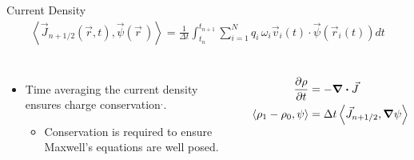 \documentclass[aspectratio=169, 16pt]{beamer}
\newcommand{\pdiff}[2]{
    \frac{\partial #1}{\partial #2}
}
\begin{document}
\begin{frame}{Current Density} 
    \vspace{1cm}
      \begin{align*}
        \left<
          \vec{J}_{n + 1/2}
          \left(\vec{r}, t\right),
          \vec{\psi}(\vec{r}\,)
          \right> =
        \frac{1}{\Delta t}
        \int_{t_n}^{t_{n+1}}
        \sum_{i=1}^N
        q_i \,\omega_i
        \vec{v}_i(t)
        \cdot
        \vec{\psi}(\vec{r}_i(t))
        dt
      \end{align*} 
      \vspace{-1cm}
  \begin{columns}
      \vspace{0.5cm}
      \begin{itemize}
        \item Time averaging the current density ensures charge conservation\cite{eastwood1991virtual}$^,$\cite{pinto2014charge}.
        \begin{itemize}
          \item Conservation is required to ensure Maxwell's equations are well posed.
        \end{itemize}
      \end{itemize}
      \begin{align*}
        \pdiff{\rho}{t} &= - \div \vec{J}\\
        \left< \rho_1 - \rho_0, \psi \right> &= \Delta t \left< \vec{J}_{n + 1/2}, \grad \psi \right>
      \end{align*}


\end{columns}
\end{frame}
\end{document}
